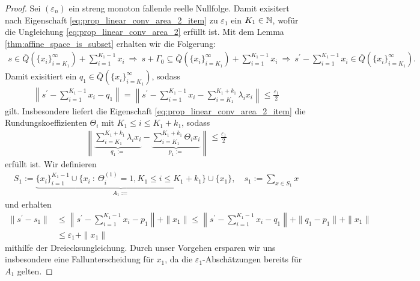 \begin{proof}
	Sei $ (\varepsilon_n) $ ein streng monoton fallende reelle Nullfolge.
	Damit exisitert nach Eigenschaft \ref{eq:prop_linear_conv_area_2_item} zu $ \varepsilon_1 $ ein $ K_1 \in \mathbb{N} $, wofür die Ungleichung \eqref{eq:prop_linear_conv_area_2} erfüllt ist.
	Mit dem Lemma \ref{thm:affine_space_is_subset} erhalten wir die Folgerung:
	\begin{align*}
		s \in \overline{Q}(\{x_i\}_{i=K_1}^\infty)  + \sum_{i=1}^{K_1 - 1} x_i
		\ \Rightarrow \
		s + \Gamma_0 \subseteq \overline{Q}(\{x_i\}_{i=K_1}^\infty)  + \sum_{i=1}^{K_1 - 1} x_i
		\ \Rightarrow \
		s^\prime - \sum_{i=1}^{K_1 - 1} x_i \in \overline{Q}(\{x_i\}_{i=K_1}^\infty).
	\end{align*}
	Damit exisitiert ein $ q_1 \in \overline{Q}(\{x_i\}_{i=K_1}^\infty) $, sodass
	\begin{align*}
		\left\| s^\prime - \sum \limits_{i= 1}^{K_1 - 1} x_i - q_1
		\right\|
		=
		\left\| s^\prime - \sum \limits_{i = 1}^{K_1 - 1} x_i - \sum \limits_{i=K_1}^{K_1 + k_1} \lambda_{i} x_i
		\right\|
		\leq \frac{\varepsilon_1}{2}
	\end{align*}
	gilt. Insbesondere liefert die Eigenschaft \ref{eq:prop_linear_conv_area_2_item} die Rundungskoeffizienten $ \Theta_i $ mit $ K_1 \leq i \leq K_1 + k_1$, sodass
	\begin{align*}
		\left\| 
		\underbrace{\sum \limits_{i = K_1}^{K_1+ k_1} \lambda_i x_{i}}_{q_1 := }
		- 
		\underbrace{\sum \limits_{i = K_1}^{K_1+ k_1}\Theta_i x_i }_{p_1 :=}
		\right\| 
		\leq \frac{\varepsilon_1}{2}
	\end{align*}
	erfüllt ist.
	Wir definieren
	\begin{align*}
		S_1 := \underbrace{\{x_i\}_{i =1}^{K_1 - 1} \cup \{x_i \ : \  \Theta_i^{(1)} = 1, K_1 \leq i \leq K_1 + k_1\}}_{A_1 :=} \cup \{x_1\}, \quad
		s_1 := \sum \limits_{x \in S_1} x
	\end{align*}
	und erhalten 
	\begin{align*}
		\|
		s^\prime - s_1
		\|
		&\leq
		\left\|
		s^\prime  - \sum \limits_{i= 1}^{K_1 - 1} x_i - p_1
		\right\| + \|x_1\|
		\leq
			\left\|
		s^\prime  - \sum \limits_{i= 1}^{K_1 - 1} x_i - q_1
		\right\|
		+
		\|q_1 - p_1\| 
		+ 
		\|x_1\|\\
		&\leq 
		\varepsilon_1 + \|x_1\|
	\end{align*}
	mithilfe der Dreiecksungleichung. Durch unser Vorgehen ersparen wir uns insbesondere eine Fallunterscheidung für $ x_1 $, da die $ \varepsilon_1 $-Abschätzungen bereits für $ A_1 $ gelten.

\end{proof}
